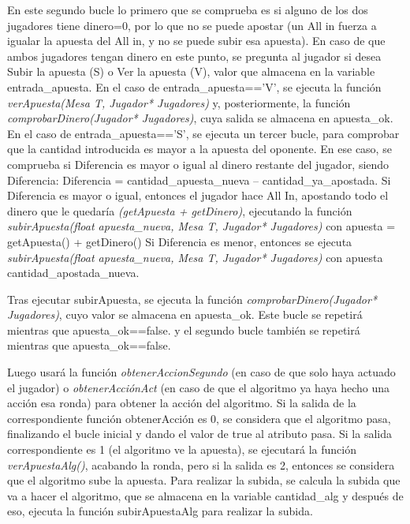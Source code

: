 En este segundo bucle lo primero que se comprueba es si alguno de los dos jugadores tiene dinero=0, por lo que no se puede apostar (un All in fuerza a igualar la apuesta del All in, y no se puede subir esa apuesta). En caso de que ambos jugadores tengan dinero en este punto, se pregunta al jugador si desea Subir la apuesta (S) o Ver la apuesta (V), valor que almacena en la variable entrada\_apuesta.
En el caso de entrada\_apuesta==’V’, se ejecuta la función \textit{verApuesta(Mesa T, Jugador* Jugadores)} y, posteriormente, la función \textit{comprobarDinero(Jugador* Jugadores)}, cuya salida se almacena en apuesta\_ok.
En el caso de entrada\_apuesta==’S’, se ejecuta un tercer bucle, para comprobar que la cantidad introducida es mayor a la apuesta del oponente. En ese caso, se comprueba si Diferencia es mayor o igual al dinero restante del jugador, siendo Diferencia:
Diferencia = cantidad\_apuesta\_nueva – cantidad\_ya\_apostada.
Si Diferencia es mayor o igual, entonces el jugador hace All In, apostando todo el dinero que le quedaría \textit{(getApuesta + getDinero)}, ejecutando la función \textit{subirApuesta(float apuesta\_nueva, Mesa T, Jugador* Jugadores)} con apuesta = getApuesta() + getDinero()
Si Diferencia es menor, entonces se ejecuta \textit{subirApuesta(float apuesta\_nueva, Mesa T, Jugador* Jugadores)} con apuesta cantidad\_apostada\_nueva.

Tras ejecutar subirApuesta, se ejecuta la función \textit{comprobarDinero(Jugador* Jugadores)}, cuyo valor se almacena en apuesta\_ok.
Este bucle se repetirá mientras que apuesta\_ok==false. y el segundo bucle también se repetirá mientras que apuesta\_ok==false.

Luego usará la función \textit{obtenerAccionSegundo} (en caso de que solo haya actuado el jugador) o \textit{obtenerAcciónAct} (en caso de que el algoritmo ya haya hecho una acción esa ronda) para obtener la acción del algoritmo. Si la salida de la correspondiente función obtenerAcción es 0, se considera que el algoritmo pasa, finalizando el bucle inicial y dando el valor de true al atributo pasa. Si la salida correspondiente es 1 (el algoritmo ve la apuesta), se ejecutará la función \textit{ verApuestaAlg()}, acabando la ronda, pero si la salida es 2, entonces se considera que el algoritmo sube la apuesta. 
Para realizar la subida, se calcula la subida que va a hacer el algoritmo, que se almacena en la variable cantidad\_alg y después de eso, ejecuta la función subirApuestaAlg para realizar la subida.

